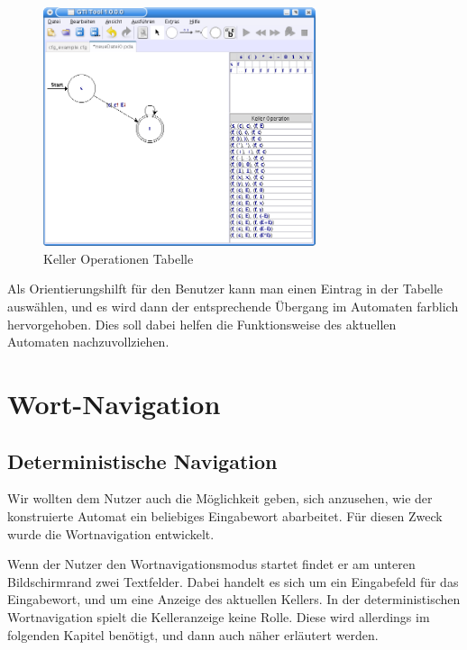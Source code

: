 \begin{figure}[h!]
\begin{center}
\includegraphics[width=8cm]{../images/stack_operation_table.png}
\caption{Keller Operationen Tabelle}
\end{center}
\end{figure}

Als Orientierungshilft für den Benutzer kann man einen Eintrag in der Tabelle
auswählen, und es wird dann der entsprechende Übergang im Automaten farblich
hervorgehoben. Dies soll dabei helfen die Funktionsweise des aktuellen
Automaten nachzuvollziehen.\vspace{10pt}


\section{Wort-Navigation}


\subsection{Deterministische Navigation}

Wir wollten dem Nutzer auch die Möglichkeit geben, sich anzusehen, wie der
konstruierte Automat ein beliebiges Eingabewort abarbeitet. Für diesen Zweck
wurde die Wortnavigation entwickelt.\vspace{10pt}

Wenn der Nutzer den Wortnavigationsmodus startet findet er am unteren
Bildschirmrand zwei Textfelder. Dabei handelt es sich um ein Eingabefeld für
das Eingabewort, und um eine Anzeige des aktuellen Kellers. In der
deterministischen Wortnavigation spielt die Kelleranzeige keine Rolle. Diese
wird allerdings im folgenden Kapitel benötigt, und dann auch näher erläutert
werden.\vspace{10pt}

